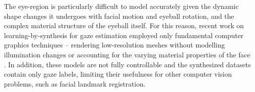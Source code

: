 
The eye-region is particularly difficult to model accurately given the dynamic shape changes it undergoes with facial motion and eyeball rotation, and the complex material structure of the eyeball itself.
For this reason, recent work on learning-by-synthesis for gaze estimation employed only fundamental computer graphics techniques -- rendering low-resolution meshes without modelling illumination changes or accounting for the varying material properties of the face \cite{sugano2014learning,lu2012head}.
In addition, these models are not fully controllable and the synthesized datasets contain only gaze labels, limiting their usefulness for other computer vision problems, such as facial landmark registration.





